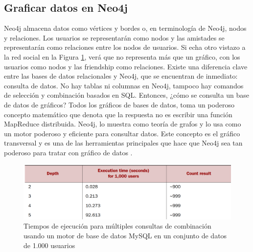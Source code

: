 \subsection{Graficar datos en Neo4j}
Neo4j almacena datos como vértices y bordes o, en terminología de Neo4j, nodos y relaciones. Los usuarios se representarán como nodos y las amistades se representarán como relaciones entre los nodos de usuarios. Si echa otro vistazo a la red social en la Figura \ref{fig:tiempos}, verá que no representa más que un gráfico, con los usuarios como nodos y las friendship como relaciones.
Existe una diferencia clave entre las bases de datos relacionales y Neo4j, que
se encuentran de inmediato: consulta de datos. No hay tablas ni columnas en Neo4j, tampoco hay comandos de selección y combinación basados en SQL. Entonces, ¿cómo se consulta un base de datos de gráficos?
Todos los gráficos de bases de datos, toma un poderoso concepto matemático que denota que la respuesta no es escribir una función MapReduce distribuida. Neo4j, lo muestra como teoría de grafos y lo usa como un motor poderoso y eficiente para consultar datos. Este concepto es el gráfico transversal y es una de las herramientas principales que hace que Neo4j sea tan poderoso para tratar con gráfico de datos \cite{vukotic2015neo4j}.
\begin{figure}[H]
    \centering
    \includegraphics[scale=0.4]{Graficos/ppp.png}
    \caption{Tiempos de ejecución para múltiples consultas de combinación usando un motor de base de datos MySQL en un conjunto de datos de 1.000 usuarios}
    \label{fig:tiempos}
\end{figure}
